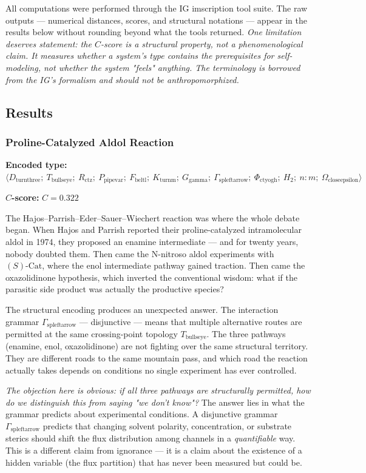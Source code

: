 \documentclass[12pt,a4paper]{article}
\begin{document}
All computations were performed through the IG imscription tool suite. The raw outputs --- numerical distances, scores, and structural notations --- appear in the results below without rounding beyond what the tools returned. \emph{One limitation deserves statement: the $C$-score is a structural property, not a phenomenological claim. It measures whether a system's type contains the prerequisites for self-modeling, not whether the system "feels" anything. The terminology is borrowed from the IG's formalism and should not be anthropomorphized.}

\subsection{Results}

\subsubsection{Proline-Catalyzed Aldol Reaction}

\textbf{Encoded type:} $\langle D_{\text{turnthree}};\ T_{\text{bullseye}};\ R_{\text{ctz}};\ P_{\text{pipevar}};\ F_{\text{beltl}};\ K_{\text{turnm}};\ G_{\text{gamma}};\ \Gamma_{\text{spleftarrow}};\ \Phi_{\text{ctyogh}};\ H_2;\ n{:}m;\ \Omega_{\text{closeepsilon}} \rangle$

\textbf{$C$-score:} $C = 0.322$

The Hajos--Parrish--Eder--Sauer--Wiechert reaction was where the whole debate began. When Hajos and Parrish reported their proline-catalyzed intramolecular aldol in 1974, they proposed an enamine intermediate --- and for twenty years, nobody doubted them. Then came the N-nitroso aldol experiments with $(S)\text{-Cat}$, where the enol intermediate pathway gained traction. Then came the oxazolidinone hypothesis, which inverted the conventional wisdom: what if the parasitic side product was actually the productive species?

The structural encoding produces an unexpected answer. The interaction grammar $\Gamma_{\text{spleftarrow}}$ --- disjunctive --- means that multiple alternative routes are permitted at the same crossing-point topology $T_{\text{bullseye}}$. The three pathways (enamine, enol, oxazolidinone) are not fighting over the same structural territory. They are different roads to the same mountain pass, and which road the reaction actually takes depends on conditions no single experiment has ever controlled.

\emph{The objection here is obvious: if all three pathways are structurally permitted, how do we distinguish this from saying "we don't know"?} The answer lies in what the grammar predicts about experimental conditions. A disjunctive grammar $\Gamma_{\text{spleftarrow}}$ predicts that changing solvent polarity, concentration, or substrate sterics should shift the flux distribution among channels in a \emph{quantifiable} way. This is a different claim from ignorance --- it is a claim about the existence of a hidden variable (the flux partition) that has never been measured but could be.
\end{document}
